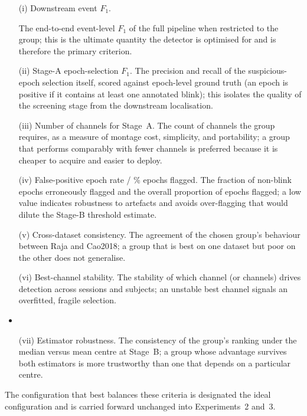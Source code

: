 \begin{itemize}
  \item[(i) Downstream event $F_1$.]

  The end-to-end event-level $F_1$ of the full pipeline
    when restricted to the group; this is the ultimate quantity the detector is optimised
    for and is therefore the primary criterion.
  \item[(ii) Stage-A epoch-selection $F_1$.] The precision and recall of the
    suspicious-epoch selection itself, scored against epoch-level ground truth (an epoch is
    positive if it contains at least one annotated blink); this isolates the quality of the
    screening stage from the downstream localisation.
  \item[(iii) Number of channels for Stage~A.] The count of channels the group requires,
    as a measure of montage cost, simplicity, and portability; a group that performs
    comparably with fewer channels is preferred because it is cheaper to acquire and easier
    to deploy.

  \item[(iv) False-positive epoch rate / \% epochs flagged.] The fraction of non-blink
    epochs erroneously flagged and the overall proportion of epochs flagged; a low value
    indicates robustness to artefacts and avoids over-flagging that would dilute the
    Stage-B threshold estimate.

  \item[(v) Cross-dataset consistency.] The agreement of the chosen group's behaviour
    between Raja and Cao2018; a group that is best on one dataset but poor on the other does
    not generalise.

  \item[(vi) Best-channel stability.] The stability of which channel (or channels) drives
    detection across sessions and subjects; an unstable best channel signals an
    overfitted, fragile selection.
  \item
  \item[(vii) Estimator robustness.] The consistency of the group's ranking under the
    median versus mean centre at Stage~B; a group whose advantage survives both estimators
    is more trustworthy than one that depends on a particular centre.
\end{itemize}
The configuration that best balances these criteria is designated the ideal configuration
and is carried forward unchanged into Experiments~2 and~3.


